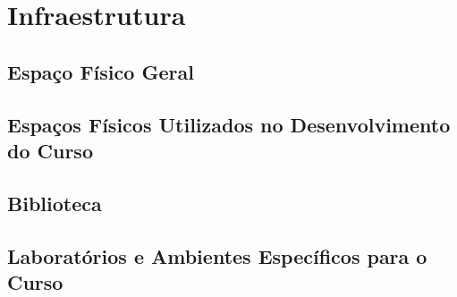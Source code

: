 \newpage
\section{Infraestrutura}

\subsection{Espa\c{c}o F\'isico Geral}


\subsection{Espa\c{c}os F\'isicos Utilizados no Desenvolvimento do Curso}


\subsection{Biblioteca}


\subsection{Laborat\'orios e Ambientes Espec\'ificos para o Curso}



